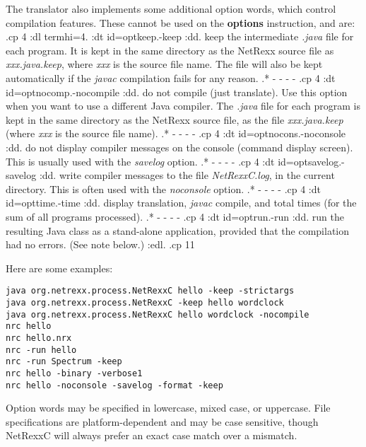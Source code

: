 The translator also implements some additional option words, which
control compilation features.  These cannot be used on the
\textbf{options} instruction, and are:
.cp 4
:dl termhi=4.
:dt id=optkeep.-keep
:dd.
keep the intermediate \emph{.java} file for each program.  It is kept in
the same directory as the NetRexx source file as \emph{xxx.java.keep},
where \emph{xxx} is the source file name.  The file will also be kept
automatically if the \emph{javac} compilation fails for any reason.
.* - - - -
.cp 4
:dt id=optnocomp.-nocompile
:dd.
do not compile (just translate).  Use this option when you want to use a
different Java compiler.  The \emph{.java} file for each program is kept
in the same directory as the NetRexx source file, as the
file \emph{xxx.java.keep} (where \emph{xxx} is the source file name).
.* - - - -
.cp 4
:dt id=optnocons.-noconsole
:dd.
do not display compiler messages on the console (command display
screen).  This is usually used with the \emph{savelog} option.
.* - - - -
.cp 4
:dt id=optsavelog.-savelog
:dd.
write compiler messages to the file \emph{NetRexxC.log}, in the current
directory.
This is often used with the \emph{noconsole} option.
.* - - - -
.cp 4
:dt id=opttime.-time
:dd.
display translation, \emph{javac} compile, and total times (for the sum
of all programs processed).
.* - - - -
.cp 4
:dt id=optrun.-run
:dd.
run the resulting Java class as a stand-alone application, provided that
the compilation had no errors.
(See note below.)
:edl.
.cp 11

Here are some examples:
\begin{verbatim}
java org.netrexx.process.NetRexxC hello -keep -strictargs
java org.netrexx.process.NetRexxC -keep hello wordclock
java org.netrexx.process.NetRexxC hello wordclock -nocompile
nrc hello
nrc hello.nrx
nrc -run hello
nrc -run Spectrum -keep
nrc hello -binary -verbose1
nrc hello -noconsole -savelog -format -keep
\end{verbatim}

Option words may be specified in lowercase, mixed case, or uppercase.
File specifications are platform-dependent and may be case sensitive,
though NetRexxC will always prefer an exact case match over a mismatch.

